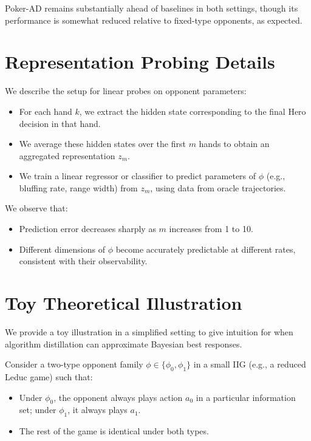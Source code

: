 \documentclass{article}
\begin{document}
Poker-AD remains substantially ahead of baselines in both settings, though its performance is somewhat reduced relative to fixed-type opponents, as expected.

\section{Representation Probing Details}
\label{app:probe}

We describe the setup for linear probes on opponent parameters:
\begin{itemize}[leftmargin=*]
    \item For each hand $k$, we extract the hidden state corresponding to the final Hero decision in that hand.
    \item We average these hidden states over the first $m$ hands to obtain an aggregated representation $z_m$.
    \item We train a linear regressor or classifier to predict parameters of $\phi$ (e.g., bluffing rate, range width) from $z_m$, using data from oracle trajectories.
\end{itemize}

We observe that:
\begin{itemize}[leftmargin=*]
    \item Prediction error decreases sharply as $m$ increases from 1 to 10.
    \item Different dimensions of $\phi$ become accurately predictable at different rates, consistent with their observability.
\end{itemize}

\section{Toy Theoretical Illustration}
\label{app:toy_theory}

We provide a toy illustration in a simplified setting to give intuition for when algorithm distillation can approximate Bayesian best responses.

Consider a two-type opponent family $\phi \in \{\phi_0, \phi_1\}$ in a small IIG (e.g., a reduced Leduc game) such that:
\begin{itemize}[leftmargin=*]
    \item Under $\phi_0$, the opponent always plays action $a_0$ in a particular information set; under $\phi_1$, it always plays $a_1$.
    \item The rest of the game is identical under both types.
\end{itemize}
\end{document}
